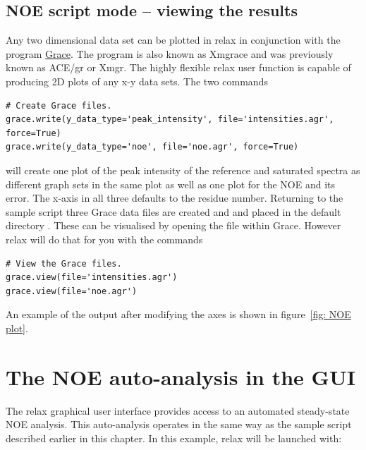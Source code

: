 \subsection{NOE script mode -- viewing the results}

Any two dimensional data set can be plotted in relax in conjunction with the program \href{http://plasma-gate.weizmann.ac.il/Grace/}{Grace}.
The program is also known as Xmgrace and was previously known as ACE/gr or Xmgr.
The highly flexible relax user function  is capable of producing 2D plots of any x-y data sets.
The two commands

\begin{lstlisting}[firstnumber=39]
# Create Grace files.
grace.write(y_data_type='peak_intensity', file='intensities.agr', force=True)
grace.write(y_data_type='noe', file='noe.agr', force=True)
\end{lstlisting}

will create one plot of the peak intensity of the reference and saturated spectra as different graph sets in the same plot as well as one plot for the NOE and its error.
The x-axis in all three defaults to the residue number.
Returning to the sample script three Grace data files are created  and  and placed in the default directory .
These can be visualised by opening the file within Grace.
However relax will do that for you with the commands

\begin{lstlisting}[firstnumber=43]
# View the Grace files.
grace.view(file='intensities.agr')
grace.view(file='noe.agr')
\end{lstlisting}

An example of the output after modifying the axes is shown in figure~\ref{fig: NOE plot}.



\newpage
\section{The NOE auto-analysis in the GUI}

The relax graphical user interface provides access to an automated steady-state NOE analysis.
This auto-analysis operates in the same way as the sample script described earlier in this chapter.
In this example, relax will be launched with:


